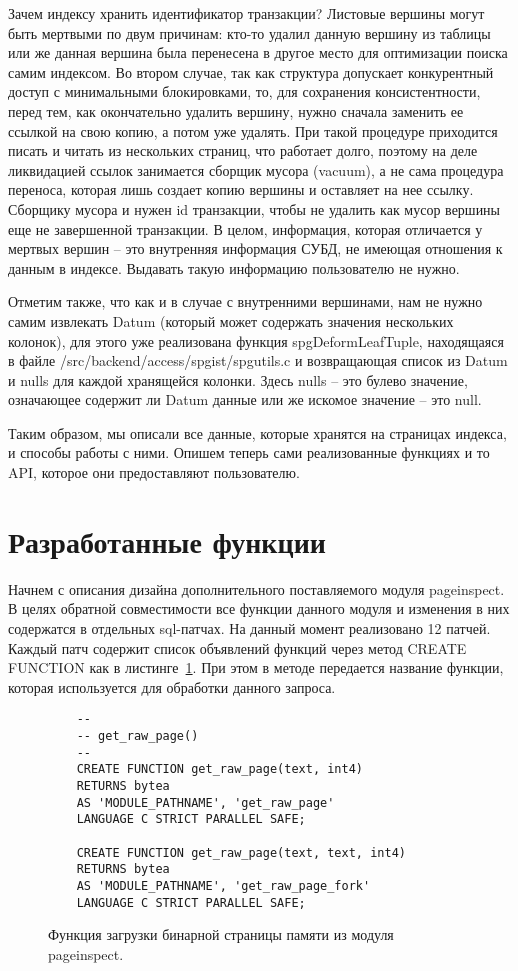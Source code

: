 \documentclass[12pt,oneside]{amsart}
\begin{document}
Зачем индексу хранить идентификатор транзакции? Листовые вершины могут быть мертвыми по двум причинам: кто-то удалил данную вершину из таблицы или же данная вершина была перенесена в другое место для оптимизации поиска самим индексом. Во втором случае, так как структура допускает конкурентный доступ с минимальными блокировками, то, для сохранения консистентности, перед тем, как окончательно удалить вершину, нужно сначала заменить ее ссылкой на свою копию, а потом уже удалять. При такой процедуре приходится писать и читать из нескольких страниц, что работает долго, поэтому на деле ликвидацией ссылок занимается сборщик мусора (vacuum), а не сама процедура переноса, которая лишь создает копию вершины и оставляет на нее ссылку. Сборщику мусора и нужен id транзакции, чтобы не удалить как мусор вершины еще не завершенной транзакции. В целом, информация, которая отличается у мертвых вершин -- это внутренняя информация СУБД, не имеющая отношения к данным в индексе. Выдавать такую информацию пользователю не нужно.

Отметим также, что как и в случае с внутренними вершинами, нам не нужно самим извлекать Datum (который может содержать значения нескольких колонок), для этого уже реализована функция spgDeformLeafTuple, находящаяся в файле /src/backend/access/spgist/spgutils.c и возвращающая список из Datum и nulls для каждой хранящейся колонки. Здесь nulls -- это булево значение, означающее содержит ли Datum данные или же искомое значение -- это null.

Таким образом, мы описали все данные, которые хранятся на страницах индекса, и способы работы с ними. Опишем теперь сами реализованные функциях и то API, которое они предоставляют пользователю.

\section{Разработанные функции}

Начнем с описания дизайна дополнительного поставляемого модуля pageinspect. В целях обратной совместимости все функции данного модуля и изменения в них содержатся в отдельных sql-патчах. На данный момент реализовано 12 патчей. Каждый патч содержит список объявлений функций через метод CREATE FUNCTION как в листинге~\ref{pg_raw}. При этом в методе передается название функции, которая используется для обработки данного запроса.

\lstset{
	language=SQL
}

\begin{figure}[ht]
\begin{lstlisting}
	--
	-- get_raw_page()
	--
	CREATE FUNCTION get_raw_page(text, int4)
	RETURNS bytea
	AS 'MODULE_PATHNAME', 'get_raw_page'
	LANGUAGE C STRICT PARALLEL SAFE;

	CREATE FUNCTION get_raw_page(text, text, int4)
	RETURNS bytea
	AS 'MODULE_PATHNAME', 'get_raw_page_fork'
	LANGUAGE C STRICT PARALLEL SAFE;
\end{lstlisting}
\caption{Функция загрузки бинарной страницы памяти из модуля pageinspect.}\label{pg_raw}
\end{figure}
\end{document}
